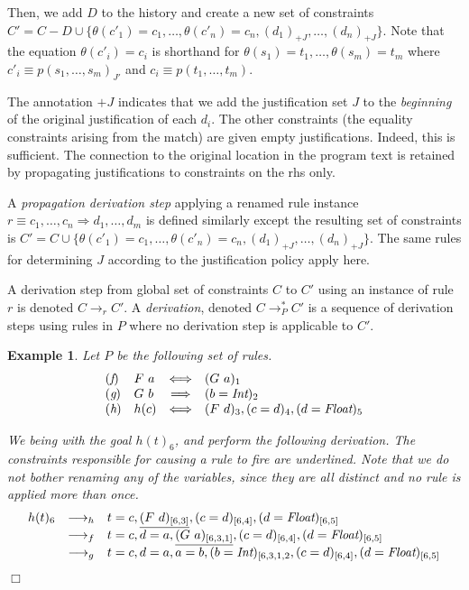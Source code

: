 \documentclass{article}
\newcommand{\ba}{\begin{array}}
\newcommand{\ea}{\end{array}}
\newcommand{\bda}{\[\ba}
\newcommand{\eda}{\ea\]}
\newcommand{\simparrow}[0]{\Longleftrightarrow}
\newcommand{\proparrow}[0]{\Longrightarrow}
\newcommand{\rightarrowtail}{\longrightarrow}
\newtheorem{ex}{Example}
\newenvironment{example}{
        \begin{ex}\rm}%
	{\hfill$\Box$\end{ex}}
\newcommand{\Int}{\mbox{\it Int}}
\newcommand{\Float}{\mbox{\it Float}}
\begin{document}
Then, we add $D$ to the history and create a new set of constraints
$C' = C - D \cup \{ \theta(c'_1) = c_1, \ldots, \theta(c'_n) =
c_n, (d_1)_{+J}, \ldots, (d_n)_{+J}\}$.
Note that the equation $\theta (c'_i) = c_i$ is shorthand for
$\theta (s_1) = t_1, \ldots, \theta (s_m) = t_m$ where $c'_i \equiv p(s_1, \ldots, s_m)_{J'}$
and $c_i \equiv p(t_1, \ldots, t_m)$.

The annotation $+J$ indicates that we add the justification set
$J$ to the {\em beginning} of the original justification of each $d_i$.
The other constraints  
(the equality constraints arising from the match)
are given empty justifications. 
Indeed, this is sufficient.
The connection to the original
location in the program text is retained by 
propagating justifications to constraints
on the rhs only.

A \emph{propagation derivation step} 
applying a renamed rule instance 
$r \equiv c_1, \ldots, c_n \proparrow d_1, \ldots, d_m$ 
is defined similarly except the resulting set of constraints is
$C' = C \cup \{ \theta(c'_1) = c_1, \ldots, \theta(c'_n) =
c_n, (d_1)_{+J}, \ldots, (d_n)_{+J}\}$.
The same rules for determining $J$ according to the justification policy 
apply here.
 
A derivation step from global set of constraints $C$ to $C'$
using an instance of rule $r$ is denoted $C \rightarrowtail_r C'$.
A \emph{derivation}, denoted $C \rightarrowtail_P^* C'$
is a sequence of derivation steps using rules in $P$ where
no derivation step is applicable to $C'$.

\begin{example}
Let $P$ be the following set of rules.
\bda{llcl}
\rulelabel{f} & F~a  & \simparrow & (G~a)_1 \\
\rulelabel{g} & G~b  & \proparrow & (b = \Int)_2 \\
\rulelabel{h} & h(c) & \simparrow & (F~d)_3, (c = d)_4, (d = \Float)_5
\eda

We being with the goal $h(t)_6$, and perform the following derivation.
The constraints responsible for causing a rule to fire are underlined.
Note that we do not bother renaming any of the variables, since they are all
distinct and no rule is applied more than once.
\bda{rcl}
h(t)_6 & \rightarrowtail_h & t = c, \underline{(F~d)_{[6,3]}}, 
                             (c = d)_{[6,4]}, (d = \Float)_{[6,5]} \\
       & \rightarrowtail_f & t = c, d = a, \underline{(G~a)_{[6,3,1]}}, 
                             (c = d)_{[6,4]}, (d = \Float)_{[6,5]} \\
       & \rightarrowtail_g & t = c, d = a, a = b, (b = \Int)_{[6,3,1,2},
                             (c = d)_{[6,4]}, (d = \Float)_{[6,5]}
\eda

\end{example}
\end{document}
